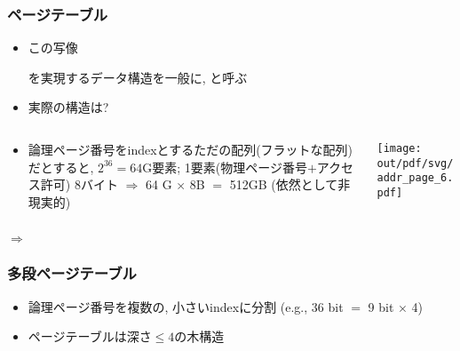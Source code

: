 \documentclass[12pt,dvipdfmx]{beamer}
\begin{document}
\begin{frame}
  \frametitle{ページテーブル}
  \begin{itemize}
  \item この写像

    \begin{center}
    \end{center}

    を実現するデータ構造を一般に, と呼ぶ
      
  \item 実際の構造は?
  \end{itemize}
  
  \begin{columns}
    \begin{column}{0.6\textwidth}
      \begin{itemize}
      \item   論理ページ番号をindexとするただの配列(フラットな配列)だとすると,
        $2^{36} = 64\mbox{G}$要素; 1要素(物理ページ番号$+$アクセス許可) 8バイト
        $\Rightarrow$ 64 G $\times$ 8B $=$ 512GB (依然として非現実的)
      \end{itemize}
    \end{column}
    \begin{column}{0.5\textwidth}
      \begin{center}
        \texttt{[image: out/pdf/svg/addr\_page\_6.pdf]}
      \end{center}
    \end{column}
  \end{columns}

  $\Rightarrow$ 
  
\end{frame}

\begin{frame}
  \frametitle{多段ページテーブル}
  \begin{itemize}
  \item 論理ページ番号を複数の, 小さいindexに分割
    (e.g., 36 bit $=$ 9 bit $\times$ 4)
  \item ページテーブルは深さ$\leq 4$の木構造
    
    
    \begin{center}
    \end{center}
  \end{itemize}
\end{frame}
\end{document}
